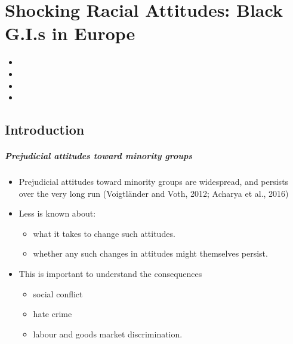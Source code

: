 \documentclass[../root]{subfiles}
\begin{document}
    \chapter{Shocking Racial Attitudes: Black G.I.s in Europe}

    \begin{shortsummary}
        \begin{itemize}
            \item {}
            \item {}
            \item {}
            \item {}
        \end{itemize}
    \end{shortsummary}

    \section{Introduction}

    \paragraph{Prejudicial attitudes toward minority groups}

    \begin{itemize}
      \item Prejudicial attitudes toward minority groups are widespread, and persists over the very long run (Voigtl\"{a}nder and Voth, 2012; Acharya et al., 2016)
      \item Less is known about:
      \begin{itemize}
        \item what it takes to change such attitudes.
        \item whether any such changes in attitudes might themselves persist.
      \end{itemize}
      \item This is important to understand the consequences
      \begin{itemize}
        \item social conflict
        \item hate crime
        \item labour and goods market discrimination.
      \end{itemize}
    \end{itemize}
\end{document}
